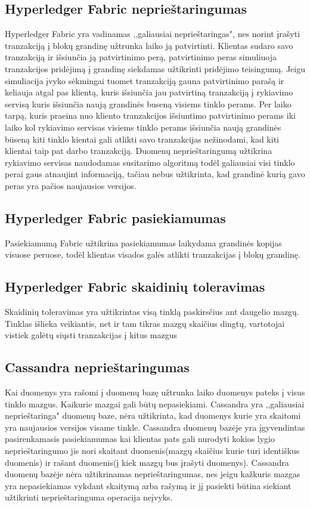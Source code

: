 \documentclass{VUMIFPSkursinis}
\begin{document}
	\subsection{Hyperledger Fabric neprieštaringumas}
		Hyperledger Fabric yra vadinamas ,,galiausiai neprieštaringas", nes norint įrašyti tranzakciją į blokų grandinę užtrunka laiko ją patvirtinti. Klientas sudaro savo tranzakciją ir išsiunčia ją patvirtinimo perą, patvirtinimo peras simuliuoja tranzakcijos pridėjimą į grandinę siekdamas užtikrinti pridėjimo teisingumą. Jeigu simuliacija įvyko sėkmingai tuomet tranzakciją gauna patvirtinimo parašą ir keliauja atgal pas klientą, kuris išsiunčia jau patvirtiną tranzakciją į rykiavimo servisą kuris išsiunčia naują grandinės buseną visiems tinklo perams. Per laiko tarpą, kuris praeina nuo kliento tranzakcijos išsiuntimo patvirtinimo perams iki laiko kol rykiavimo servisas visiems tinklo perams išsiunčia naują grandinės būseną kiti tinklo kientai gali atlikti savo tranzakcijas nežinodami, kad kiti klientai taip pat darbo tranzakciją. Duomenų neprieštaringumą užtikrina rykiavimo servisas naudodamas susitarimo algoritmą todėl galiausiai visi tinklo perai gaus atnaujint informaciją, tačiau nebus užtikrinta, kad grandinė kurią gavo peras yra pačios naujausios versijos. \cite{HypDoc}
	\subsection{Hyperledger Fabric pasiekiamumas}
		Pasiekiamumą Fabric užtikrina pasiekiamumas laikydama grandinės kopijas visuose peruose, todėl klientas visados galės atlikti tranzakcijas į blokų grandinę. \cite{HypDoc}
	\subsection{Hyperledger Fabric skaidinių toleravimas}
		Skaidinių toleravimas yra užtikrintas visą tinklą paskirsčius ant daugelio mazgų. Tinklas išlieka veikiantis, net ir tam tikras mazgų skaičius dingtų, vartotojai vistiek galėtų siųsti tranzakcijas į kitus mazgus\cite{HypDoc}
	\subsection{Cassandra neprieštaringumas}
		Kai duomenys yra rašomi į duomenų bazę užtrunka laiko duomenys pateks į visus tinklo mazgus. Kaikurie mazgai gali būtų nepasiekiami. Cassandra yra ,,galiausiai neprieštaringa" duomenų baze, nėra užtikrinta, kad duomenys kurie yra skaitomi yra naujausios versijos visame tinkle. 
Cassandra duomenų bazėje yra įgyvendintas pasirenkamasis pasiekiamumas kai klientas pats gali nurodyti kokios lygio neprieštaringumo jis nori skaitant duomenis(mazgų skaičius kurie turi identiškus duomenis) ir rašant duomenis(į kiek mazgų bus įrašyti duomenys). Cassandra duomenų bazėje nėra užtikrinamas neprieštaringumas, nes jeigu kažkuris mazgas yra nepasiekiamas vykdant skaitymą arba rašymą ir jį pasiekti būtina siekiant užtikrinti neprieštaringuma operacija neįvyks. \cite{CasDesk}
\end{document}
